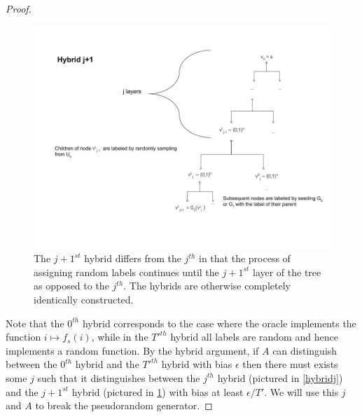 \begin{proof}
\begin{figure}
\centering
\includegraphics[width=\textwidth, height=0.25\paperheight, keepaspectratio]{../figure/hybrid_j1_thm_5-1.jpg}
\caption{The \(j+1^{st}\) hybrid differs from the \(j^{th}\) in that the
process of assigning random labels continues until the \(j+1^{st}\)
layer of the tree as opposed to the \(j^{th}\). The hybrids are
otherwise completely identically constructed.}
\label{hybridj1}
\end{figure}

Note that the \(0^{th}\) hybrid corresponds to the case where the oracle
implements the function \(i\mapsto f_s(i)\), while in the \(T'^{th}\)
hybrid all labels are random and hence implements a random function. By
the hybrid argument, if \(A\) can distinguish between the \(0^{th}\)
hybrid and the \(T'^{th}\) hybrid with bias \(\epsilon\) then there must
exists some \(j\) such that it distinguishes between the \(j^{th}\)
hybrid (pictured in \cref{hybridj}) and the \(j+1^{st}\) hybrid
(pictured in \cref{hybridj1}) with bias at least \(\epsilon/T'\). We
will use this \(j\) and \(A\) to break the pseudorandom generator.



\end{proof}
